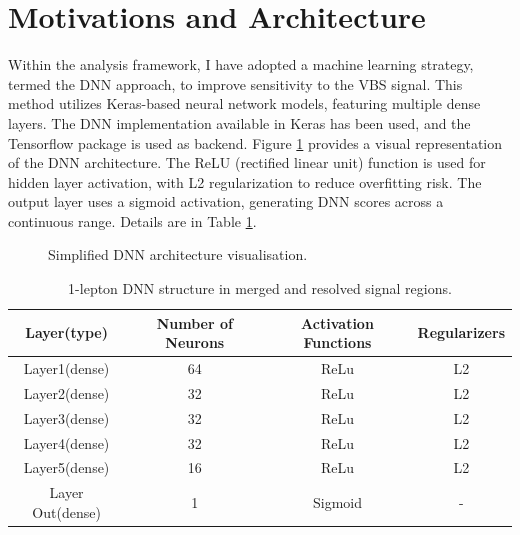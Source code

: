 
\section{Motivations and Architecture}
\label{sec:motivations_and_architecture}

Within the analysis framework, I have adopted a machine learning strategy, termed the DNN approach, to improve sensitivity to the VBS signal. This method utilizes Keras-based neural network models, featuring multiple dense layers. 
The DNN implementation available in Keras \cite{chollet2015keras} has been used, and the Tensorflow package \cite{tensorflow2015-whitepaper} is used as backend.
Figure \ref{fig:DNNArchitecturePic} provides a visual representation of the DNN architecture.
The ReLU (rectified linear unit) function is used for hidden layer activation, with L2 regularization to reduce overfitting risk. The output layer uses a sigmoid activation, generating DNN scores across a continuous range. Details are in Table \ref{tab:1lepDNN layers}.

\begin{figure}[ht]
       \centering
       \caption{Simplified DNN architecture visualisation.}
       \label{fig:DNNArchitecturePic}
\end{figure}

\begin{table}[ht]
    \centering
    \begin{tabular}{c|c|c|c}
     Layer(type) & Number of Neurons & Activation Functions & Regularizers\\
     \hline
     \hline
     Layer1(dense) & 64 & ReLu & L2\\
     Layer2(dense) & 32 & ReLu & L2\\
     Layer3(dense) & 32 & ReLu & L2\\
     Layer4(dense) & 32 & ReLu & L2\\
     Layer5(dense) & 16 & ReLu & L2\\
     Layer Out(dense) & 1 & Sigmoid & -\\
    \end{tabular}
    \caption{1-lepton DNN structure in merged and resolved signal regions.}
    \label{tab:1lepDNN layers}
\end{table}

